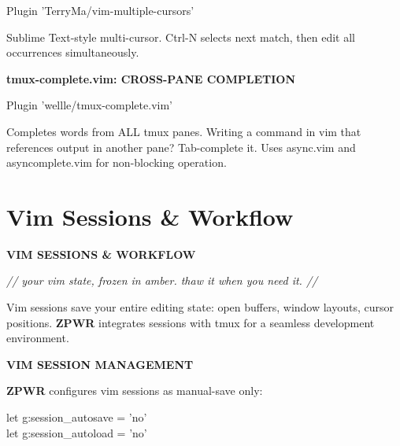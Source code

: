 \documentclass[11pt,a4paper,twoside]{book}
\begin{document}
\begin{codebox}
\color{neongreen}Plugin 'TerryMa/vim-multiple-cursors'\\
\end{codebox}

Sublime Text-style multi-cursor. Ctrl-N selects next match, then edit all occurrences simultaneously.


\vspace{12pt}
{\bfseries\color{neonyellow} tmux-complete.vim: CROSS-PANE COMPLETION}\vspace{4pt}

\begin{codebox}
\color{neongreen}Plugin 'wellle/tmux-complete.vim'\\
\end{codebox}

Completes words from ALL tmux panes. Writing a command in vim that references output in another pane? Tab-complete it. Uses async.vim and asyncomplete.vim for non-blocking operation.


\vspace{16pt}

\section{Vim Sessions \& Workflow}


\vspace{10pt}
{\large\bfseries\color{neoncyan} VIM SESSIONS \& WORKFLOW}\vspace{6pt}

{\small\itshape\color{dimtext} // your vim state, frozen in amber. thaw it when you need it. //}

Vim sessions save your entire editing state: open buffers, window layouts, cursor positions. \textbf{ZPWR} integrates sessions with tmux for a seamless development environment.


\vspace{12pt}
{\bfseries\color{neonyellow} VIM SESSION MANAGEMENT}\vspace{4pt}

\textbf{ZPWR} configures vim sessions as manual-save only:

\begin{codebox}
\color{neongreen}let g:session\_autosave = 'no'\\
\color{neongreen}let g:session\_autoload = 'no'\\
\end{codebox}
\end{document}
